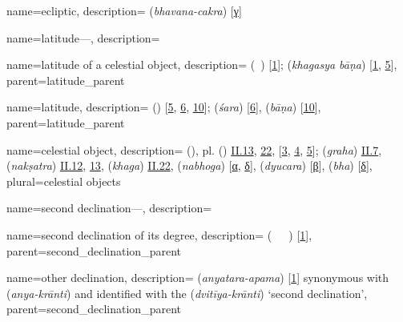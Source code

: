 {
        name={ecliptic},     
        description={ (\textit{bhavana-cakra}) [\hyperlink{SEpassC}{γ}]} 
}

{
        name={latitude---},
        description={\phantom{x}\nopagebreak}
}

{
        name={latitude of a celestial object},
        description={ (\ard\idafaconsonant\ \kawkab) [\hyperlink{PEpass1}{1}];  (\textit{khagasya bāṇa}) [\hyperlink{SEpass1}{1}, \hyperlink{SEpass5}{5}]},
        parent={latitude_parent}
}

{
        name={latitude},
        description={  (\ard) [\hyperlink{PEpass5}{5}, \hyperlink{PEpass6}{6}, \hyperlink{PEpass10}{10}];  (\textit{śara}) [\hyperlink{SEpass6}{6}],  (\textit{bāṇa}) [\hyperlink{SEpass10}{10}]},
        parent={latitude_parent}
}
 
{
        name={celestial object},
        description={ (\kawkab), pl.\thinspace {} (\kawakib)   \hyperlink{Pii13}{II.13}, \hyperlink{Pii22}{22}, [\hyperlink{PEpass3}{3}, \hyperlink{PEpass4}{4}, \hyperlink{PEpass5}{5}];
        (\textit{graha}) \hyperlink{Sii7}{II.7},  (\textit{nakṣatra}) \hyperlink{Sii12}{II.12}, \hyperlink{Sii13}{13},  (\textit{khaga}) \hyperlink{Sii22}{II.22},  (\textit{nabhoga}) [\hyperlink{SEpassA}{α}, \hyperlink{SEpassD}{δ}],  (\textit{dyucara}) [\hyperlink{SEpassB}{β}],  (\textit{bha}) [\hyperlink{SEpassD}{δ}]},
        plural={celestial objects}
}

{
        name={second declination---},
        description={\phantom{x}\nopagebreak}
}

{
        name={second declination of its degree},
        description={ (\mayl\idafaconsonant\ \thani\idafavowel\ \daraji\idafavowel\ \uy) [\hyperlink{PEpass1}{1}]},
        parent={second_declination_parent}
}

{
        name={other declination},
        description={ (\textit{anyatara-apama}) [\hyperlink{SEpass1}{1}]\newline
        synonymous with  (\textit{anya-krānti}) and identified with the  (\textit{dvitīya-krānti}) `second declination'},
        parent={second_declination_parent}
}

